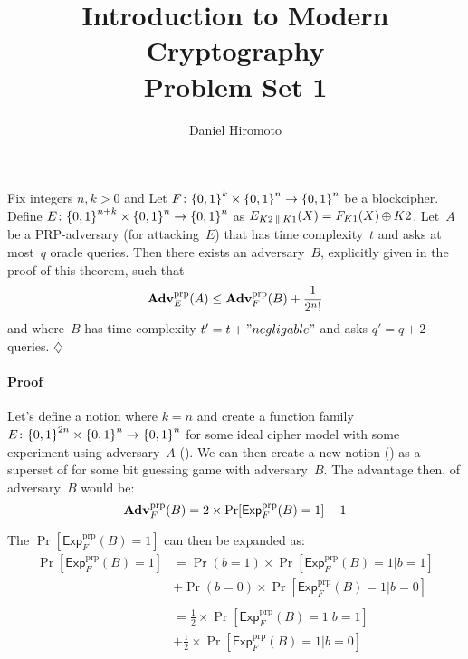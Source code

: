 \documentclass[11pt]{article}
\title{{\bf  Introduction to Modern Cryptography}\\ Problem Set 1 \\[2ex] }
\author{Daniel Hiromoto}
\newcommand{\ExpPRP}[2]{\mathsf{Exp}^{\mathrm{prp}}_{#1}{(#2)}}
\newcommand{\AdvPRP}[2]{\Adv^{\mathrm{prp}}_{#1}(#2)}
\begin{document}
  \maketitle
  \thispagestyle{empty}
  
\begin{theorem}  Fix integers $n,k>0$ and Let $F\colon{\{0,1\}}^k \times {\{0,1\}}^n \to {\{0,1\}}^n$ be a blockcipher.  Define $E\colon {\{0,1\}}^{n+k} \times {\{0,1\}}^n \to {\{0,1\}}^n$ as $E_{K2 \:\|\: K1}(X) = F_{K1}(X) {\,\oplus\,} K2$.  Let~$A$ be a PRP-adversary (for attacking~$E$) that has time complexity~$t$ and asks at most~$q$ oracle queries.  Then there exists an adversary~$B$, explicitly given in the proof of this theorem, such that
  \begin{equation}
     \AdvPRP{E}{A} \leq \AdvPRP{F}{B} + \frac{1}{2^{n}!}
  \end{equation}
and where~$B$ has time complexity $t'=t + "negligable"$ and asks $q'=q+2$ queries. \hfill$\diamondsuit$
\end{theorem}

\paragraph{Proof} Let's define a notion where $k = n$ and create a function family 
$E\colon{\{0,1\}}^{2n}\times{\{0,1\}}^n \to {\{0,1\}}^n$ for some ideal cipher model with some experiment using adversary~$A$ ().
We can then create a new notion () as a superset of  for some bit guessing game with adversary~$B$. The advantage then, of adversary~$B$ would be:
\[
  \AdvPRP{F}{B} = 2 \times \Pr[\ExpPRP{F}{B} = 1] - 1
\]

The $\Pr[\ExpPRP{F}{B} = 1]$ can then be expanded as:
\begin{equation}
  \begin{aligned}
  \Pr[\ExpPRP{F}{B} = 1] 
                        & = \Pr(b = 1) \times \Pr[\ExpPRP{F}{B} = 1 \vert b = 1]  \\
                        & + \Pr(b = 0) \times \Pr[\ExpPRP{F}{B} = 1 \vert b = 0] \\
                        \\
                        & = \frac{1}{2} \times \Pr[\ExpPRP{F}{B} = 1 \vert b = 1]  \\
                        & + \frac{1}{2} \times \Pr[\ExpPRP{F}{B} = 1 \vert b = 0] 
  \end{aligned}
\end{equation}
\end{document}
